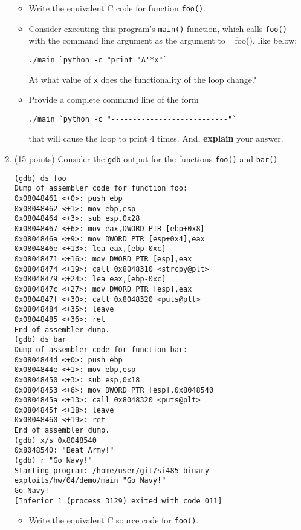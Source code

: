 \documentclass{article}[9pt]
\begin{document}
\begin{enumerate}
\begin{itemize}
\item Write the equivalent C code for function \texttt{foo()}.

\item Consider executing this program's \texttt{main()} function, which
calls \texttt{foo()} with the command line argument as the argument to
=foo(), like below:

\begin{verbatim}
./main `python -c "print 'A'*x"`
\end{verbatim}

At what value of \texttt{x} does the functionality of the loop change?

\item Provide a complete command line of the form 
\begin{verbatim}
./main `python -c "---------------------------"`
\end{verbatim}
that will cause the loop to print 4 times. And, \textbf{explain} your answer.
\end{itemize}

\item (15 points) Consider the \texttt{gdb} output for the functions \texttt{foo()} and \texttt{bar()}

\begin{verbatim}
(gdb) ds foo
Dump of assembler code for function foo:
0x08048461 <+0>: push ebp
0x08048462 <+1>: mov ebp,esp
0x08048464 <+3>: sub esp,0x28
0x08048467 <+6>: mov eax,DWORD PTR [ebp+0x8]
0x0804846a <+9>: mov DWORD PTR [esp+0x4],eax
0x0804846e <+13>: lea eax,[ebp-0xc]
0x08048471 <+16>: mov DWORD PTR [esp],eax
0x08048474 <+19>: call 0x8048310 <strcpy@plt>
0x08048479 <+24>: lea eax,[ebp-0xc]
0x0804847c <+27>: mov DWORD PTR [esp],eax
0x0804847f <+30>: call 0x8048320 <puts@plt>
0x08048484 <+35>: leave
0x08048485 <+36>: ret
End of assembler dump.
(gdb) ds bar
Dump of assembler code for function bar:
0x0804844d <+0>: push ebp
0x0804844e <+1>: mov ebp,esp
0x08048450 <+3>: sub esp,0x18
0x08048453 <+6>: mov DWORD PTR [esp],0x8048540
0x0804845a <+13>: call 0x8048320 <puts@plt>
0x0804845f <+18>: leave
0x08048460 <+19>: ret
End of assembler dump.
(gdb) x/s 0x8048540
0x8048540: "Beat Army!"
(gdb) r "Go Navy!"
Starting program: /home/user/git/si485-binary-exploits/hw/04/demo/main "Go Navy!"
Go Navy!
[Inferior 1 (process 3129) exited with code 011]
\end{verbatim}

\begin{itemize}
\item Write the equivalent C source code for \texttt{foo()}.


\end{itemize}
\end{enumerate}
\end{document}

